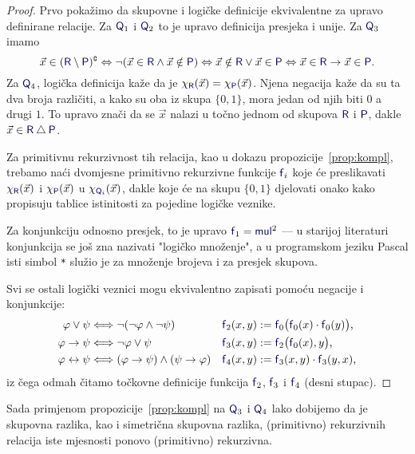 \begin{proof}
Prvo pokažimo da skupovne i logičke definicije ekvivalentne za upravo definirane relacije. Za $\f Q_1$ i $\f Q_2$ to je upravo definicija presjeka i unije. Za $\f Q_3$ imamo
    \begin{equation}
    \vec x\in(\f R\setminus\f P)\kompl\Leftrightarrow\lnot(\vec x\in\f R\land\vec x\notin\f P)\Leftrightarrow\vec x\notin\f R\lor\vec x\in\f P\Leftrightarrow\vec x\in \f R\to\vec x\in\f P\text.
\end{equation}
Za $\f Q_4$, logička definicija kaže da je $\chi_{\f R}(\vec x)=\chi_{\f P}(\vec x)$. Njena negacija kaže da su ta dva broja različiti, a kako su oba iz skupa $\{0,1\}$, mora jedan od njih biti $0$ a drugi $1$. To upravo znači da se $\vec x$ nalazi u točno jednom od skupova $\f R$ i $\f P$, dakle $\vec x\in\f R\mathbin\triangle\f P$.

Za primitivnu rekurzivnost tih relacija, kao u dokazu propozicije~\ref{prop:kompl}, trebamo naći dvomjesne primitivno rekurzivne funkcije $\f f_i$ koje će preslikavati $\chi_{\f R}(\vec x)$ i $\chi_{\f P}(\vec x)$ u $\chi_{\f Q_i}(\vec x)$, dakle koje će na skupu $\{0,1\}$ djelovati onako kako propisuju tablice istinitosti za pojedine logičke veznike.

Za konjunkciju odnosno presjek, to je upravo $\f f_1=\f{mul}^2$ --- u starijoj literaturi konjunkcija se još zna nazivati "logičko množenje", a u programskom jeziku Pascal isti simbol \texttt{*} služio je za množenje brojeva i za presjek skupova.

Svi se ostali logički veznici mogu ekvivalentno zapisati pomoću negacije i konjunkcije:
\begin{align}
    \varphi\lor\psi&\Longleftrightarrow\lnot(\lnot\varphi\land\lnot\psi)
    &
    \f f_2(x,y)&:=
    \f f_0\bigl(
      \f f_0(x)\cdot\f f_0(y)
    \bigr)\text,
    \\
    \varphi\to\psi&\Longleftrightarrow\lnot\varphi\lor\psi
    &
    \f f_3(x,y)&:=\f f_2\bigl(\f f_0(x),y\bigr)\text,
    \\
    \varphi\leftrightarrow\psi&\Longleftrightarrow(\varphi\to\psi)\land(\psi\to\varphi)
    &
    \f f_4(x,y)&:=\f f_3(x,y)\cdot\f f_3(y,x)\text,
\end{align}
iz čega odmah čitamo točkovne definicije funkcija $\f f_2$, $\f f_3$ i $\f f_4$ (desni stupac).
\end{proof}

Sada primjenom propozicije~\ref{prop:kompl} na $\f Q_3$ i $\f Q_4$ lako dobijemo da je skupovna razlika, kao i simetrična skupovna razlika, (primitivno) rekurzivnih relacija iste mjesnosti ponovo (primitivno) rekurzivna.

